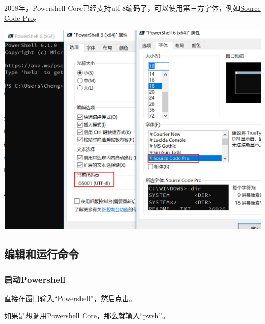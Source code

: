 \documentclass[11pt]{ctexart}
\makeatletter
\def\maxwidth{\ifdim\Gin@nat@width>\linewidth\linewidth
    \else\Gin@nat@width\fi}
\let\Oldincludegraphics\includegraphics
\renewcommand{\includegraphics}[1]{\Oldincludegraphics[width=.8\maxwidth]{#1}}
\makeatother
\begin{document}
2018年，Powershell
Core已经支持utf-8编码了，可以使用第三方字体，例如\href{https://github.com/adobe-fonts/source-code-pro}{Source
Code Pro}。

\includegraphics{image/ps5-core.png}

    \hypertarget{ux7f16ux8f91ux548cux8fd0ux884cux547dux4ee4}{%
\subsection{编辑和运行命令}\label{ux7f16ux8f91ux548cux8fd0ux884cux547dux4ee4}}

    \hypertarget{ux542fux52a8powershell}{%
\subsubsection{启动Powershell}\label{ux542fux52a8powershell}}

直接在窗口输入``Powershell''，然后点击。

如果是想调用Powershell Core，那么就输入``pwsh''。
\end{document}
